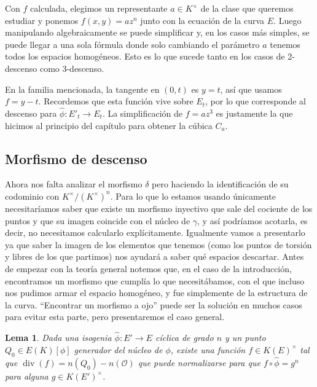 \documentclass[a4paper]{book}
\theoremstyle{definition}
\theoremstyle{plain}
\newtheorem{lemma}[definition]{Lema}
\newcommand{\OO}{\mathcal{O}}
\newcommand{\KmodN}{K^\times/{(K^\times)}^n}
\begin{document}
Con $f$ calculada, elegimos un representante $a\in K^\times$ de la clase que queremos estudiar y ponemos $f(x,y)=az^n$ junto con la ecuación de la curva $E$. Luego manipulando algebraicamente se puede simplificar y, en los casos más simples, se puede llegar a una sola fórmula donde solo cambiando el parámetro $a$ tenemos todos los espacios homogéneos. Esto es lo que sucede tanto en los casos de 2-descenso como 3-descenso.

En la familia mencionada, la tangente en $(0,t)$ es $y=t$, así que usamos $f=y-t$. Recordemos que esta función vive sobre $E_t$, por lo que corresponde al descenso para $\hat\phi:E'_t\to E_t$. La simplificación de $f=az^3$ es justamente la que hicimos al principio del capítulo para obtener la cúbica $C_a$.

\subsection{Morfismo de descenso}

Ahora nos falta analizar el morfismo $\delta$ pero haciendo la identificación de su codominio con $\KmodN$. Para lo que lo estamos usando únicamente necesitaríamos saber que existe un morfismo inyectivo que sale del cociente de los puntos y que su imagen coincide con el núcleo de $\gamma$, y así podríamos acotarla, es decir, no necesitamos calcularlo explícitamente. Igualmente vamos a presentarlo ya que saber la imagen de los elementos que tenemos (como los puntos de torsión y libres de los que partimos) nos ayudará a saber qué espacios descartar. Antes de empezar con la teoría general notemos que, en el caso de la introducción, encontramos un morfismo que cumplía lo que necesitábamos, con el que incluso nos pudimos armar el espacio homogéneo, y fue simplemente de la estructura de la curva. ``Encontrar un morfismo a ojo'' puede ser la solución en muchos casos para evitar esta parte, pero presentaremos el caso general.

\begin{lemma}\label{lemma:funcionDescenso}
Dada una isogenia $\hat\phi:E'\to E$ cíclica de grado $n$ y un punto $Q_0\in E(K)[\phi]$ generador del núcleo de $\phi$, existe una función $f\in {K(E)}^\times$ tal que $\operatorname{div}(f)=n(Q_0)-n(\OO)$ que puede normalizarse para que $f\circ\hat\phi=g^n$ para alguna $g\in {K(E')}^\times$.
\end{lemma}
\end{document}
